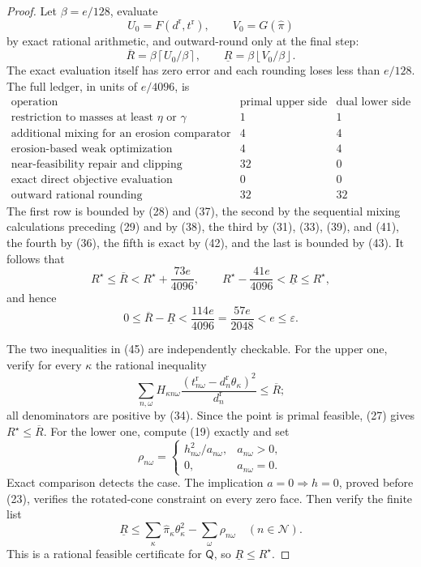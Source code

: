 \documentclass{article}
\begin{document}
\begin{proof}
Let \(\beta=e/128\), evaluate
\[
 U_0=F(d^{\mathrm r},t^{\mathrm r}),
 \qquad V_0=G(\widehat\pi)
\tag{42}
\]
by exact rational arithmetic, and outward-round only at the final step:
\[
 \overline R=\beta\left\lceil U_0/\beta\right\rceil,
 \qquad
 \underline R=\beta\left\lfloor V_0/\beta\right\rfloor.
\tag{43}
\]
The exact evaluation itself has zero error and each rounding loses less than \(e/128\).  The full ledger, in units of \(e/4096\), is
\[
\begin{array}{c|c|c}
\text{operation}&\text{primal upper side}&\text{dual lower side}\\ \hline
\text{restriction to masses at least }\eta\text{ or }\gamma&1&1\\
\text{additional mixing for an erosion comparator}&4&4\\
\text{erosion-based weak optimization}&4&4\\
\text{near-feasibility repair and clipping}&32&0\\
\text{exact direct objective evaluation}&0&0\\
\text{outward rational rounding}&32&32
\end{array}
\tag{44}
\]
The first row is bounded by (28) and (37), the second by the sequential mixing calculations preceding (29) and by (38), the third by (31), (33), (39), and (41), the fourth by (36), the fifth is exact by (42), and the last is bounded by (43).  It follows that
\[
 R^\star\le\overline R<R^\star+\frac{73e}{4096},
 \qquad
 R^\star-\frac{41e}{4096}<\underline R\le R^\star,
\tag{45}
\]
and hence
\[
 0\le\overline R-\underline R
 <\frac{114e}{4096}=\frac{57e}{2048}<e\le\varepsilon.
\tag{46}
\]

The two inequalities in (45) are independently checkable.  For the upper one, verify for every \(\kappa\) the rational inequality
\[
 \sum_{n,\omega}H_{\kappa n\omega}
 \frac{(t^{\mathrm r}_{n\omega}-d_n^{\mathrm r}\theta_\kappa)^2}
      {d_n^{\mathrm r}}
 \le\overline R;
\tag{47}
\]
all denominators are positive by (34).  Since the point is primal feasible, (27) gives \(R^\star\le\overline R\).  For the lower one, compute (19) exactly and set
\[
 \rho_{n\omega}=\begin{cases}
 h_{n\omega}^2/a_{n\omega},&a_{n\omega}>0,\\
 0,&a_{n\omega}=0.
 \end{cases}
\tag{48}
\]
Exact comparison detects the case.  The implication \(a=0\Rightarrow h=0\), proved before (23), verifies the rotated-cone constraint on every zero face.  Then verify the finite list
\[
 \underline R\le
 \sum_\kappa\widehat\pi_\kappa\theta_\kappa^2
 -\sum_\omega\rho_{n\omega}
 \quad(n\in\mathcal N).
\tag{49}
\]
This is a rational feasible certificate for \(\mathsf Q\), so \(\underline R\le R^\star\).


\end{proof}
\end{document}
